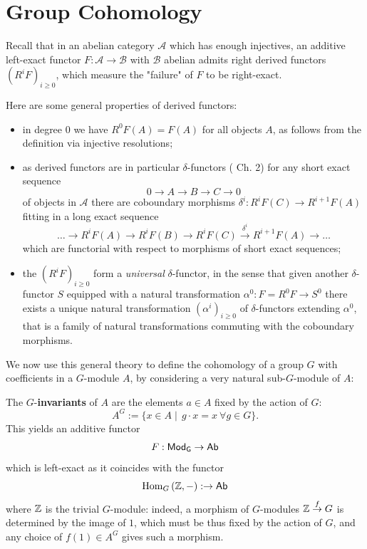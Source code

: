\documentclass[a4paper, oneside]{memoir}
\begin{document}
\section{Group Cohomology}

Recall that in an abelian category $\mathcal{A}$ which has enough injectives, an additive left-exact functor $F:\mathcal{A}\to\mathcal{B}$ with $\mathcal{B}$ abelian admits right derived functors $(R^iF)_{i\geq 0}$, which measure the "failure" of $F$ to be right-exact.

Here are some general properties of derived functors:
\begin{itemize}
    \item in degree $0$ we have $R^0F(A)=F(A)$ for all objects $A$, as follows from the definition via injective resolutions;
    \item as derived functors are in particular $\delta$-functors (\cite{Weibel} Ch. 2)
          for any short exact sequence
          \[
              0\to A\to B\to C\to 0
          \]
          of objects in $\mathcal{A}$ there are coboundary morphisms $\delta^i:R^iF(C)\to R^{i+1}F(A)$ fitting in a long exact sequence
          \[
              \ldots\to R^iF(A)\to R^iF(B)\to R^iF(C)\overset{\delta^i}{\to} R^{i+1}F(A)\to\ldots
          \]
          which are functorial with respect to morphisms of short exact sequences;
    \item the $(R^iF)_{i\geq 0}$ form a \textit{universal} $\delta$-functor, in the sense that given another $\delta$-functor $S$ equipped with a natural transformation $\alpha^0:F=R^0F\to S^0$ there exists a unique natural transformation $(\alpha^i)_{i\geq 0}$ of $\delta$-functors extending $\alpha^0$, that is a family of natural transformations commuting with the coboundary morphisms.
\end{itemize}

We now use this general theory to define the cohomology of a group $G$ with coefficients in a $G$-module $A$, by considering a very natural sub-$G$-module of $A$:

\begin{definition}
    The $G$-\textbf{invariants} of $A$ are the elements $a \in A$ fixed by the action of $G$:
    \[
        A^G:=\{x\in A\mid\, g\cdot x=x ~ \forall g\in G\}.
    \]
    This yields an additive functor
    \[
        F:\mathsf{Mod}_\mathsf{G}\to\mathsf{Ab}
    \]
    which is left-exact as it coincides with the functor
    \[
        \operatorname{Hom}_G{(\mathbb{Z},-)}:\to\mathsf{Ab}
    \]
    where $\mathbb{Z}$ is the trivial $G$-module: indeed, a morphism of $G$-modules $\mathbb{Z}\overset{f}\to G$ is determined by the image of $1$, which must be thus fixed by the action of $G$, and any choice of $f(1)\in A^G$ gives such a morphism.
\end{definition}
\end{document}
